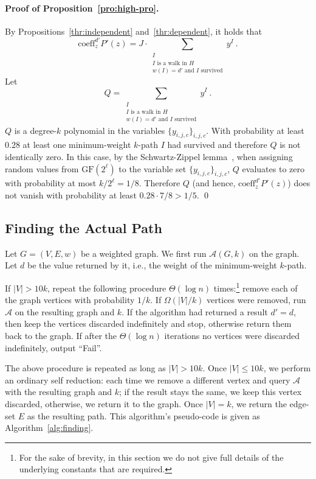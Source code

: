 \documentclass{llncs}
\newcommand{\coeff}{\mathrm{coeff}}
\newcommand{\GF}{\mathrm{GF}}
\newcommand{\abs}[1]{\lvert #1 \rvert}
\begin{document}
\paragraph{Proof of Proposition~\ref{pro:high-pro}.}
By Propositions~\ref{thr:independent} and~\ref{thr:dependent}, it holds that 
$$\coeff_z^{d'}P'(z) = J \cdot \sum_{\substack{I\\I \text{ is a walk in }H\\w(I)=d'\text{ and $I$ survived}}} y^I \ .$$
Let $$Q = \sum_{\substack{I\\I \text{ is a walk in }H\\w(I)=d'\text{ and $I$ survived}}} y^I \ .$$
$Q$ is a degree-$k$ polynomial in the variables $\{y_{i,j,c}\}_{i,j,c}$. With probability at least $0.28$ at least one minimum-weight $k$-path $I$ had survived and therefore $Q$ is not identically zero. In this case, by the Schwartz-Zippel lemma~\cite{Schwartz80,Zippel79,DL78}, when assigning random values from $\GF(2^\ell)$ to the variable set $\{y_{i,j,c}\}_{i,j,c}$, $Q$ evaluates to zero with probability at most $k/2^\ell=1/8$. Therefore $Q$ (and hence, $\coeff_z^{d'} P'(z)$) does not vanish with probability at least $0.28 \cdot 7/8 > 1/5$.
\qed


\subsection{Finding the Actual Path}\label{sec:actual:app}
Let $G=(V,E,w)$ be a weighted graph. We first run $\mathcal{A}(G,k)$ on the graph. Let $d$ be the value returned by it, i.e., the weight of the minimum-weight $k$-path. 

If $\abs{V} > 10k$, repeat the following procedure $\Theta(\log n)$ times:\footnote{For the sake of brevity, in this section we do not give full details of the underlying constants that are required.} remove each of the graph vertices with probability $1/k$. If $\Omega(\abs{V}/k)$ vertices were removed, run $\mathcal{A}$ on the resulting graph and $k$. If the algorithm had returned a result $d' = d$, then keep the vertices discarded indefinitely and stop, otherwise return them back to the graph. If after the $\Theta(\log n)$ iterations no vertices were discarded indefinitely, output ``Fail''. 

The above procedure is repeated as long as $\abs{V} > 10k$. Once $\abs{V} \leq 10k$, we perform an ordinary self reduction: each time we remove a different vertex and query $\mathcal{A}$ with the resulting graph and $k$; if the result stays the same, we keep this vertex discarded, otherwise, we return it to the graph. Once $\abs{V}=k$, we return the edge-set $E$ as the resulting path. This algorithm's pseudo-code is given as Algorithm~\ref{alg:finding}.
\end{document}
